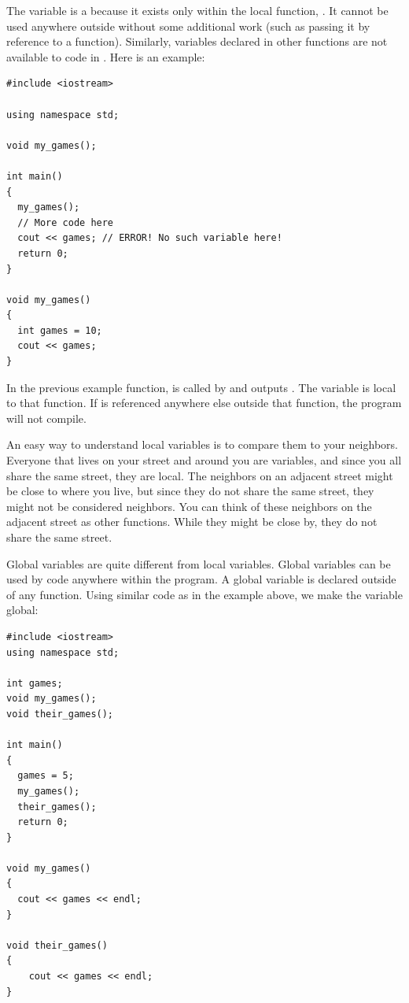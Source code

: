 The variable  is a  because it exists only within the local function, . 
It cannot be used anywhere outside  without some additional work (such as passing it by reference to a function). 
Similarly, variables declared in other functions are not available to code in . 
Here is an example: \nopagebreak[4]

\noindent\begin{minipage}{\linewidth}\begin{lstlisting}
#include <iostream>

using namespace std;
	
void my_games();

int main()
{
  my_games();
  // More code here
  cout << games; // ERROR! No such variable here!
  return 0;
}

void my_games()
{
  int games = 10;
  cout << games;
}
\end{lstlisting}\end{minipage}

In the previous example function,  is called by  and outputs .
The variable  is local to that function. 
If  is referenced anywhere else outside that function, the program will not compile.

An easy way to understand local variables is to compare them to your neighbors. 
Everyone that lives on your street and around you are variables, and since you all share the same street, they are local. 
The neighbors on an adjacent street might be close to where you live, but since they do not share the same street, they might not be considered neighbors. 
You can think of these neighbors on the adjacent street as other functions. 
While they might be close by, they do not share the same street.

Global variables are quite different from local variables. 
Global variables can be used by code anywhere within the program. 
A global variable is declared outside of any function. 
Using similar code as in the example above, we make the  variable global: \nopagebreak[4]

\noindent\begin{minipage}{\linewidth}\begin{lstlisting}
#include <iostream>
using namespace std;

int games;
void my_games();
void their_games();

int main()
{
  games = 5;
  my_games();
  their_games();
  return 0;
}

void my_games()
{
  cout << games << endl;
}

void their_games()
{
	cout << games << endl;
}
\end{lstlisting}\end{minipage}

